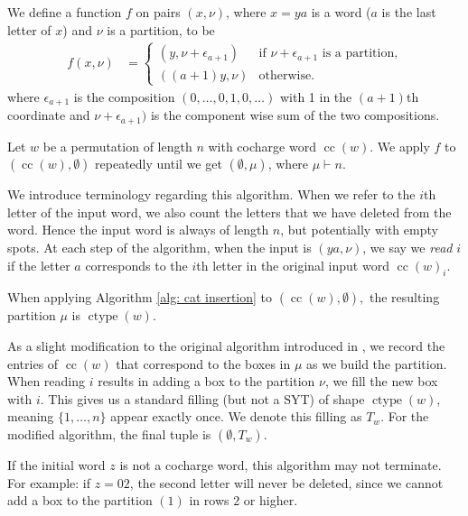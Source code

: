 \documentclass[ALCO, Unicode]{cedram}
\DeclareMathOperator{\ctype}{ctype}
\DeclareMathOperator{\cc}{cc}
\begin{document}
\begin{alg}\label{alg: cat insertion}
We define a function $f$ on pairs $(x,\nu)$, where $x = ya$ is a word ($a$ is the last letter of $x$) and $\nu$ is a partition, to be
\begin{align*}
    f(x,\nu) &= \begin{cases}
        (y,\nu + \epsilon_{a+1}) & \text{if }\nu + \epsilon_{a+1} \text{ is a partition,}\\ 
        ((a+1)y,\nu) & \text{otherwise.}
    \end{cases}
\end{align*}
where $\epsilon_{a+1} $ is the composition $(0,\dots,0, 1,0,\dots)$ with 1 in the $(a+1)$th coordinate and $\nu + \epsilon_{a+1})$ is the component wise sum of the two compositions.
 
Let $w$ be a permutation of length $n$ with cocharge word $\cc(w)$. We apply $f$ to $(\cc(w),\emptyset)$ repeatedly until we get $(\emptyset, \mu)$, where $\mu \vdash n$.
\end{alg}
We introduce terminology regarding this algorithm.
When we refer to the $i$th letter of the input word, we also count the letters that we have deleted from the word. Hence the input word is always of length $n$, but potentially with empty spots.
At each step of the algorithm, when the input is $(ya,\nu)$, we say we \textit{read} $i$ if the letter $a$ corresponds to the $i$th letter in the original input word $\cc(w)_i$.

\begin{prop}
   When applying Algorithm \ref{alg: cat insertion} to $(\cc(w),\emptyset),$ the resulting partition $\mu $ is $\ctype(w)$.
\end{prop}

As a slight modification to the original algorithm introduced in \cite{Blasiak}, we record the entries of $\cc(w)$ that correspond to the boxes in $\mu$ as we build the partition. When reading $i$ results in adding a box to the partition $\nu$, we fill the new box with $i$. This gives us a standard filling (but not a SYT) of shape $\ctype(w)$, meaning $\{1,\dots, n\}$ appear exactly once. We denote this filling as $T_w$. For the modified algorithm, the final tuple is $(\emptyset, T_w)$.

If the initial word $z$ is not a cocharge word, this algorithm may not terminate. For example: if $z = 02$, the second letter will never be deleted, since we cannot add a box to the partition $(1)$ in rows $2$ or higher.
\end{document}
